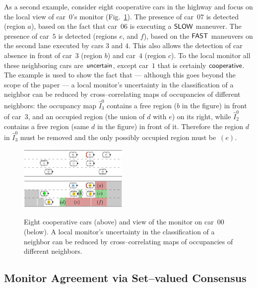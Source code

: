 As a second example, consider eight cooperative cars in the highway and focus on the local view of car~$0$'s monitor (Fig.~\ref{fig:highway_2}). The presence of car~$07$ is detected (region $a$), based on the fact that car~$06$ is executing a $\mslow$ maneuver. The presence of car~$5$ is detected (regions $e$, and $f$), based on the $\mfast$ maneuvers on the second lane executed by cars $3$ and $4$. This also allows the detection of car absence in front of car~$3$ (region $b$) and car~$4$ (region $c$). To the local monitor all these neighboring cars are $\mathsf{uncertain}$, except car~$1$ that is certainly $\mathsf{cooperative}$. The example is used to show the fact that --- although this goes beyond the scope of the paper --- a local monitor's uncertainty in the classification of a neighbor can be reduced by cross--correlating maps of occupancies of different neighbors: the occupancy map $\hat{I}_{3}^{0}$ contains a free region ($b$ in the figure) in front of car~$3$, and an occupied region (the union of $d$ with $e$) on its right, while $\hat{I}_{2}^{0}$ contains a free region (same $d$ in the figure) in front of it. Therefore the region $d$ in $\hat{I}_{3}^{0}$ must be removed and the only possibly occupied region must be~$(e)$.
\begin{figure}[!]
\centering
\includegraphics[width=0.47\textwidth]{images/simulation_02_F.pdf} \\
\includegraphics[width=0.47\textwidth]{images/monitor-everybody.pdf} \\
\caption{Eight cooperative cars (above) and view of the monitor on car~$00$ (below). A local monitor's uncertainty in the classification of a neighbor can be reduced by cross--correlating maps of occupancies of different neighbors.}
\label{fig:highway_2}
\end{figure}

\subsection{Monitor Agreement via Set--valued Consensus}

